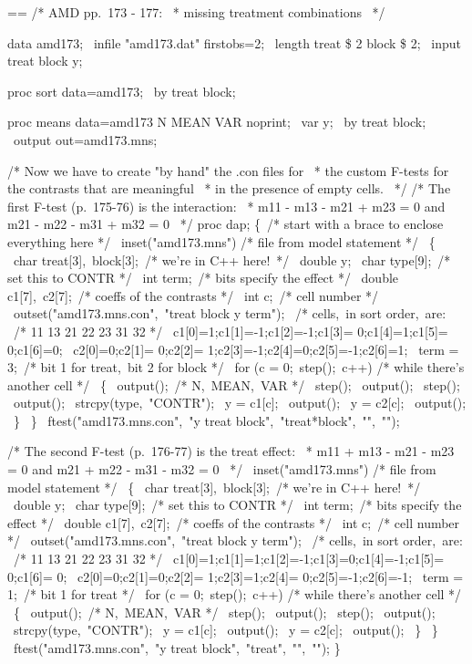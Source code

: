 \documentclass{book}
\makeatletter
\newenvironment{Texinfopreformatted}{%
  \par\GNUTobeylines\obeyspaces\frenchspacing\parskip=\z@\parindent=\z@}{}
{\catcode`\^^M=13 \gdef\GNUTobeylines{\catcode`\^^M=13 \def^^M{\null\par}}}
\newenvironment{Texinfoindented}{\begin{list}{}{}\item\relax}{\end{list}}
\renewcommand{\_}{\Texinfounderscore\discretionary{}{}{}}
\makeatother
\begin{document}
\begin{Texinfoindented}
\begin{Texinfopreformatted}%
\ttfamily 
/* AMD pp.\ 173 - 177:
\ * missing treatment combinations
\ */

data amd173;
\ infile "amd173.dat" firstobs=2;
\ length treat \$ 2 block \$ 2;
\ input treat block y;

proc sort data=amd173;
\ by treat block;

proc means data=amd173 N MEAN VAR noprint;
\ var y;
\ by treat block;
\ output out=amd173.mns;

/* Now we have to create "by hand" the .con files for
\ * the custom F-tests for the contrasts that are meaningful
\ * in the presence of empty cells.
\ */
/* The first F-test (p.\ 175-76) is the interaction:
\ * m11 - m13 - m21 + m23 = 0 and m21 - m22 - m31 + m32 = 0
\ */
proc dap;
\{\ /* start with a brace to enclose everything here */
\  inset("amd173.mns") /* file from model statement */
\   \{
\     char treat[3],\ block[3];\ /* we're in C++ here!\ */
\     double y;
\     char \_type\_[9];\ /* set this to CONTR */
\     int \_term\_;\     /* bits specify the effect */
\     double c1[7],\ c2[7];\ /* coeffs of the contrasts */
\     int c;\ /* cell number */
\     outset("amd173.mns.con",\ "treat block y \_term\_");
\     /* cells,\ in sort order,\ are:
\     /*   11       13       21       22      23       31      32 */
\     c1[0]=1;c1[1]=-1;c1[2]=-1;c1[3]= 0;c1[4]=1;c1[5]= 0;c1[6]=0;
\     c2[0]=0;c2[1]= 0;c2[2]= 1;c2[3]=-1;c2[4]=0;c2[5]=-1;c2[6]=1;
\     \_term\_ = 3;\ /* bit 1 for treat,\ bit 2 for block */
\     for (c = 0;\ step();\ c++) /* while there's another cell */
\      \{
\        output();\ /* N,\ MEAN,\ VAR */
\        step();
\        output();
\        step();
\        output();
\        strcpy(\_type\_,\ "CONTR");
\        y = c1[c];
\        output();
\        y = c2[c];
\        output();
\      \}
\   \}
\  ftest("amd173.mns.con",\ "y treat block",\ "treat*block",\ "",\ "");

/* The second F-test (p.\ 176-77) is the treat effect:
\ * m11 + m13 - m21 - m23 = 0 and m21 + m22 - m31 - m32 = 0
\ */
\  inset("amd173.mns") /* file from model statement */
\   \{
\     char treat[3],\ block[3];\ /* we're in C++ here!\ */
\     double y;
\     char \_type\_[9];\ /* set this to CONTR */
\     int \_term\_;\     /* bits specify the effect */
\     double c1[7],\ c2[7];\ /* coeffs of the contrasts */
\     int c;\ /* cell number */
\     outset("amd173.mns.con",\ "treat block y \_term\_");
\     /* cells,\ in sort order,\ are:
\     /*   11      13       21      22       23       31      32 */
\     c1[0]=1;c1[1]=1;c1[2]=-1;c1[3]=0;c1[4]=-1;c1[5]= 0;c1[6]= 0;
\     c2[0]=0;c2[1]=0;c2[2]= 1;c2[3]=1;c2[4]= 0;c2[5]=-1;c2[6]=-1;
\     \_term\_ = 1;\ /* bit 1 for treat */
\     for (c = 0;\ step();\ c++) /* while there's another cell */
\      \{
\        output();\ /* N,\ MEAN,\ VAR */
\        step();
\        output();
\        step();
\        output();
\        strcpy(\_type\_,\ "CONTR");
\        y = c1[c];
\        output();
\        y = c2[c];
\        output();
\      \}
\   \}
\  ftest("amd173.mns.con",\ "y treat block",\ "treat",\ "",\ "");
\}


\end{Texinfopreformatted}
\end{Texinfoindented}
\end{document}
